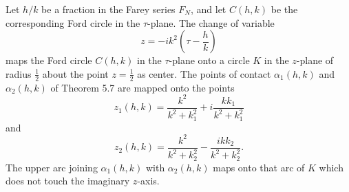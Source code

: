 Let $h/k$ be a fraction in the Farey series $F_N$, and let $C(h,k)$ be the corresponding Ford circle in the $\tau$-plane. The change of variable
$$
z = -ik^2\left(\tau - \frac{h}{k}\right)
$$
maps the Ford circle $C(h,k)$ in the $\tau$-plane onto a circle $K$ in the $z$-plane of radius $\frac{1}{2}$ about the point $z = \frac{1}{2}$ as center. The points of contact $\alpha_1(h,k)$ and $\alpha_2(h,k)$ of Theorem 5.7 are mapped onto the points
$$
z_1(h,k) = \frac{k^2}{k^2 + k_1^2} + i \frac{kk_1}{k^2 + k_1^2}
$$
and
$$
z_2(h,k) = \frac{k^2}{k^2 + k_2^2} - \frac{ikk_2}{k^2 + k_2^2}.
$$
The upper arc joining $\alpha_1(h,k)$ with $\alpha_2(h,k)$ maps onto that arc of $K$ which does not touch the imaginary $z$-axis.
